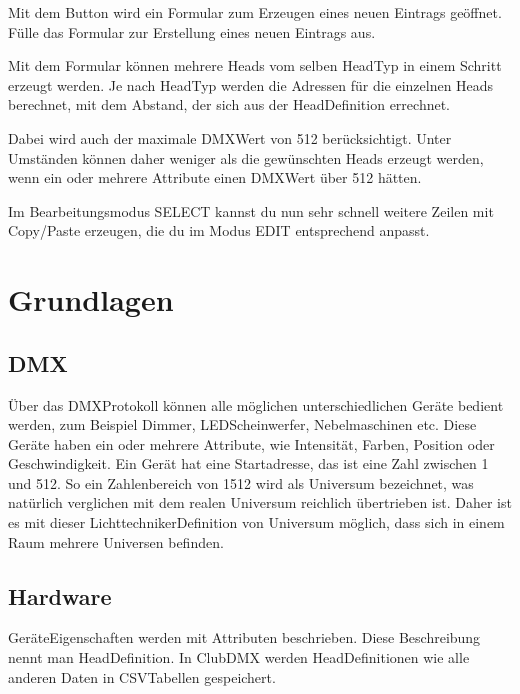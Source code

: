 \documentclass[letterpaper,10pt,ngerman]{sphinxmanual}
\begin{document}
Mit dem Button  wird ein Formular zum Erzeugen
eines neuen Eintrags geöffnet. Fülle das Formular zur
Erstellung eines neuen Eintrags aus.

Mit dem Formular können mehrere Heads vom selben Head\sphinxhyphen{}Typ in einem Schritt
erzeugt werden. Je nach Head\sphinxhyphen{}Typ werden die Adressen für die einzelnen Heads
berechnet, mit dem Abstand, der sich aus der Head\sphinxhyphen{}Definition errechnet.

Dabei wird auch der maximale DMX\sphinxhyphen{}Wert von 512 berücksichtigt.
Unter Umständen können daher weniger als die gewünschten Heads erzeugt werden,
wenn ein oder mehrere Attribute einen DMX\sphinxhyphen{}Wert über 512 hätten.

Im Bearbeitungsmodus SELECT kannst du nun sehr schnell weitere
Zeilen mit Copy/Paste erzeugen, die du im Modus EDIT entsprechend anpasst.

\noindent{}


\chapter{Grundlagen}
\label{\detokenize{grundlagen:grundlagen}}\label{\detokenize{grundlagen::doc}}

\section{DMX}
\label{\detokenize{grundlagen:dmx}}
Über das DMX\sphinxhyphen{}Protokoll können alle möglichen unterschiedlichen Geräte bedient
werden, zum Beispiel Dimmer, LED\sphinxhyphen{}Scheinwerfer, Nebelmaschinen etc. Diese Geräte
haben ein oder mehrere Attribute, wie Intensität, Farben,
Position oder Geschwindigkeit.
Ein Gerät hat eine Startadresse, das ist eine Zahl zwischen 1 und 512.
So ein Zahlenbereich von 1\sphinxhyphen{}512 wird als Universum bezeichnet, was natürlich
verglichen mit dem realen Universum reichlich übertrieben ist.
Daher ist es mit dieser Lichttechniker\sphinxhyphen{}Definition von Universum möglich,
dass sich in einem Raum mehrere Universen befinden.


\section{Hardware}
\label{\detokenize{grundlagen:hardware}}
Geräte\sphinxhyphen{}Eigenschaften werden mit Attributen beschrieben.
Diese Beschreibung nennt man Head\sphinxhyphen{}Definition.
In ClubDMX werden Head\sphinxhyphen{}Definitionen wie alle anderen Daten in CSV\sphinxhyphen{}Tabellen
gespeichert.
\end{document}
